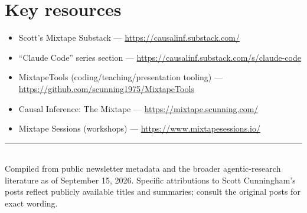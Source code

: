 \documentclass[11pt]{article}
\begin{document}
\section{Key resources}

\begin{itemize}
  \item Scott's Mixtape Substack --- \url{https://causalinf.substack.com/}
  \item ``Claude Code'' series section ---
    \url{https://causalinf.substack.com/s/claude-code}
  \item MixtapeTools (coding/teaching/presentation tooling) ---
    \url{https://github.com/scunning1975/MixtapeTools}
  \item Causal Inference: The Mixtape --- \url{https://mixtape.scunning.com/}
  \item Mixtape Sessions (workshops) --- \url{https://www.mixtapesessions.io/}
\end{itemize}

\vfill
\noindent\rule{\linewidth}{0.4pt}\\[2pt]
\small Compiled from public newsletter metadata and the broader agentic-research
literature as of September 15, 2026. Specific attributions to Scott
Cunningham's posts reflect publicly available titles and summaries; consult the
original posts for exact wording.
\end{document}
